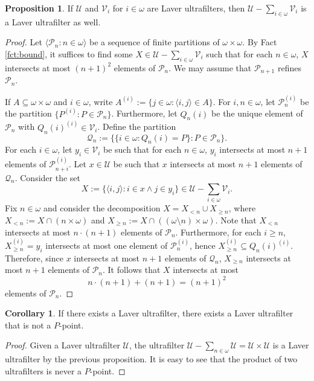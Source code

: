 \documentclass[12pt]{article}
\theoremstyle{definition}
\newtheorem{prp}[nummer]{\sc Proposition}
\newtheorem{cor}[nummer]{\sc Corollary}
\begin{document}
\begin{prp}
If $\mathcal{U}$ and $\mathcal{V}_i$ for  $i \in \omega$ are Laver ultrafilters, then ${\mathcal{U}}-\sum_{i \in \omega}\mathcal{V}_i$ is a Laver ultrafilter as well.
\end{prp}

\begin{proof}
 Let $\langle \mathcal{P}_n: n \in \omega\rangle$ be a sequence of finite partitions of $\omega \times \omega$. By Fact \ref{fct:bound}, it suffices to find some $X \in {\mathcal{U}}-\sum_{i\in \omega}\mathcal{V}_i$ such that for each $n \in \omega$, $X$ intersects at most $(n+1)^{2}$ elements of $\mathcal{P}_n$. We may assume that $\mathcal{P}_{n+1}$ refines $\mathcal{P}_n$.
 
If $A \subseteq \omega \times \omega$ and $i \in \omega$, write $A^{(i)}:=\{j \in \omega: \langle i,j\rangle \in A\}$. For $i,n \in \omega$, let $\mathcal{P}_n^{(i)}$ be the partition $\{P^{(i)}: P \in \mathcal{P}_n\}$. Furthermore, let $Q_n(i)$ be the unique element of $\mathcal{P}_n$ with $Q_n(i)^{(i)}\in \mathcal{V}_i$. Define the partition
 \[\mathcal{Q}_n:=\{\{i \in \omega: Q_n(i)=P\}: P \in \mathcal{P}_n\}.\]
 For each $i \in \omega$, let $y_i\in \mathcal{V}_i$ be such that for each $n\in \omega$, $y_i$ intersects at most $n+1$ elements of $\mathcal{P}_{n+i}^{(i)}$. Let $x \in \mathcal{U}$ be such that $x$ intersects at most $n+1$ elements of $\mathcal{Q}_n$. Consider the set
 \[X:=\{\langle i,j\rangle: i \in x \land j \in y_i\}\in \mathcal{U}-\sum_{i \in \omega}\mathcal{V}_i.\]
 Fix $n \in \omega$ and consider the decomposition $X=X_{<n} \cup X_{\geq n}$, where $X_{<n}:=X\cap (n \times \omega)$ and $X_{\geq n}:= X \cap ((\omega \setminus n)\times \omega)$. Note that $X_{<n}$ intersects at most $n \cdot (n+1)$ elements of $\mathcal{P}_n$. Furthermore, for each $i \geq n$, $X_{\geq n}^{(i)}=y_i$ intersects at most one element of $\mathcal{P}_n^{(i)}$, hence $X_{\geq n}^{(i)} \subseteq Q_n(i)^{(i)}$. Therefore, since $x$ intersects at most $n+1$ elements of $\mathcal{Q}_n$, $X_{\geq n}$ intersects at most $n+1$ elements of $\mathcal{P}_n$. It follows that $X$ intersects at most
 \[n \cdot (n+1)+(n+1)=(n+1)^{2}\]
 elements of $\mathcal{P}_n$.
 \end{proof}

\begin{cor}
If there exists a Laver ultrafilter, there exists a Laver ultrafilter that is not a $P$-point.
\end{cor}

\begin{proof}
Given a Laver ultrafilter $\mathcal{U}$, the ultrafilter $\mathcal{U}-\sum_{n\in \omega}\mathcal{U}=\mathcal{U}\times \mathcal{U}$ is a Laver ultrafilter by the previous proposition. It is easy to see that the product of two ultrafilters is never a $P$-point.
\end{proof}
\end{document}
